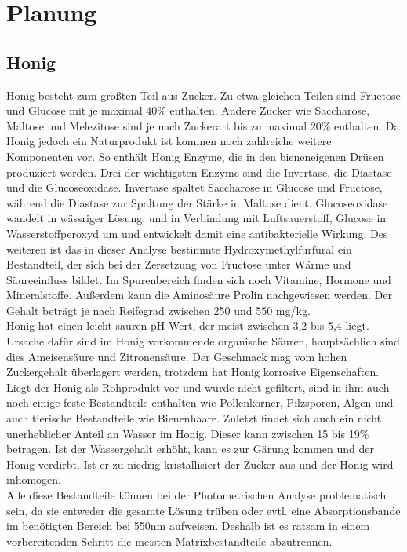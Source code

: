 \chapter{Planung}

\label{chap:Planung}


\section{Honig}
Honig besteht zum größten Teil aus Zucker. Zu etwa gleichen Teilen sind Fructose und Glucose mit je maximal 40\% enthalten. Andere Zucker wie Saccharose, Maltose und Melezitose sind je nach Zuckerart bis zu maximal 20\% enthalten. Da Honig jedoch ein Naturprodukt ist kommen noch zahlreiche weitere Komponenten vor. So enthält Honig Enzyme, die in den bieneneigenen Drüsen produziert werden. Drei der wichtigsten Enzyme sind die Invertase, die Diastase und die Glucoseoxidase. Invertase spaltet Saccharose in Glucose und Fructose, während die Diastase zur Spaltung der Stärke in Maltose dient. Glucoseoxidase wandelt in wässriger Lösung, und in Verbindung mit Luftsauerstoff, Glucose in Wasserstoffperoxyd um und entwickelt damit eine antibakterielle Wirkung. Des weiteren ist das in dieser Analyse bestimmte Hydroxymethylfurfural ein Bestandteil, der sich bei der Zersetzung von Fructose unter Wärme und Säureeinfluss bildet. Im Spurenbereich finden sich noch Vitamine, Hormone und Mineralstoffe. Außerdem kann die Aminosäure Prolin nachgewiesen werden. Der Gehalt beträgt je nach Reifegrad zwischen 250 und 550 mg/kg.\\
Honig hat einen leicht sauren pH-Wert, der meist zwischen 3,2 bis 5,4 liegt. Ursache dafür sind im Honig vorkommende organische Säuren, hauptsächlich sind dies Ameisensäure und Zitronensäure. Der Geschmack mag vom hohen Zuckergehalt überlagert werden, trotzdem hat Honig korrosive Eigenschaften.\\
Liegt der Honig als Rohprodukt vor und wurde nicht gefiltert, sind in ihm auch noch einige feste Bestandteile enthalten wie Pollenkörner, Pilzsporen, Algen und auch tierische Bestandteile wie Bienenhaare. Zuletzt findet sich auch ein nicht unerheblicher Anteil an Wasser im Honig. Dieser kann zwischen 15 bis 19\% betragen. Ist der Wassergehalt erhöht, kann es zur Gärung kommen und der Honig verdirbt. Ist er zu niedrig kristallisiert der Zucker aus und der Honig wird inhomogen.\\
Alle diese Bestandteile können bei der Photometrischen Analyse problematisch sein, da sie entweder die gesamte Lösung trüben oder evtl. eine Absorptionsbande im benötigten Bereich bei 550nm aufweisen. Deshalb ist es ratsam in einem vorbereitenden Schritt die meisten Matrixbestandteile abzutrennen. %

